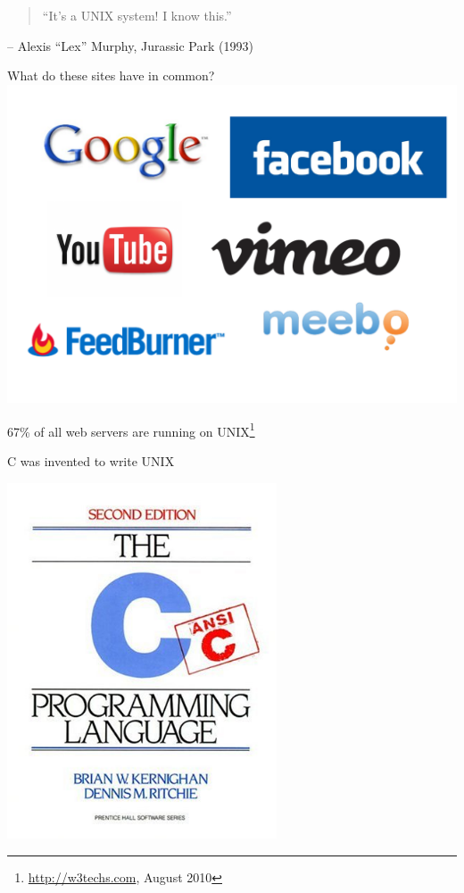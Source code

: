 \begin{frame}
\begin{quote}
``It's a UNIX system! I know this.''
\end{quote}
\begin{flushright}
-- Alexis ``Lex'' Murphy, Jurassic Park (1993)
\end{flushright}
\end{frame}


\begin{frame}{What do these sites have in common?}
\includegraphics[width=\textwidth]{site_logos} 

\pause

67\% of all web servers are running on UNIX\footnote{\url{http://w3techs.com}, August 2010}
\end{frame}

\begin{frame}{C was invented to write UNIX}
\begin{center}
\includegraphics[width=0.6\textwidth]{c}
\end{center}
\end{frame}

